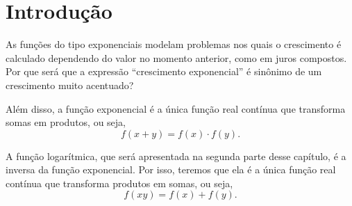 \section{Introdução}

As funções do tipo exponenciais modelam problemas nos quais o crescimento
é calculado dependendo do valor no momento anterior, como em juros
compostos. Por que será que a expressão ``crescimento exponencial''
é sinônimo de um crescimento muito acentuado?

Além disso, a função exponencial é a única função real contínua que
transforma somas em produtos, ou seja, $$f(x+y) = f(x) \cdot f(y).$$

A função logarítmica, que será apresentada na segunda parte
desse capítulo, é a inversa da função exponencial. Por isso,
teremos que ela é a única função real contínua que transforma
produtos em somas, ou seja,
$$f(xy) = f(x) + f(y).$$
